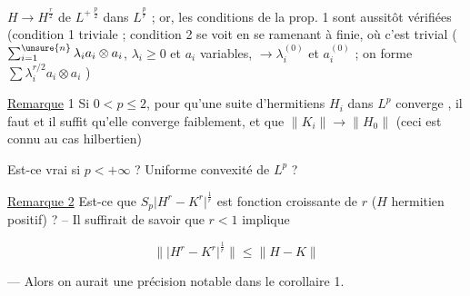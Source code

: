 $H\to H^{\frac r2}$ de $L^{+\;\frac p2}$ dans $L^{\frac pr}$ ; or, les conditions de la prop. 1 sont aussitôt vérifiées  (condition 1 triviale ; condition 2 se voit  en se ramenant à  finie, où c'est trivial ($\sum_{i=1}^{\unsure{n}}\lambda_i a_i\otimes a_i$, $\lambda_i\geq0$ et $a_i$ variables, $\to\lambda_i^{(0)}$ et $a_i^{(0)}$ ; on forme $\sum\lambda_i^{r/2}a_i\otimes a_i$ \unsure{\ldots{} --})

\uline{Remarque} 1 Si $0<p\leq2$, pour qu'une suite d'hermitiens $H_i$ dans $L^p$ converge , il faut et il suffit qu'elle converge faiblement, et que $\|K_i\|\to\|H_0\|$ (ceci est connu au cas hilbertien)


Est-ce vrai si $p<+\infty$ ? Uniforme convexité de $L^p$ ?

\uline{Remarque 2} Est-ce que $S_p\lvert H^r-K^r\rvert^{\frac1r}$ est fonction croissante de $r$ ($H$ hermitien positif) ? -- Il suffirait de savoir que $r<1$ implique

\[
\bigl\|\lvert H^r-K^r\rvert^{\frac1r}\bigr\|\leq\|H-K\|
\]

--- Alors on aurait une précision notable dans le corollaire 1.
